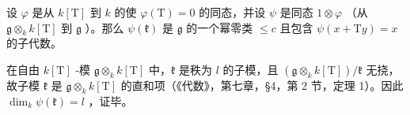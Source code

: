 设 \(\varphi\) 是从 \(k[\mathrm{T}]\) 到 \(k\) 的使 \(\varphi (\mathrm{T}) = 0\) 的同态，并设 \(\psi\) 是同态 \(1\otimes \varphi\) （从 \(\mathfrak{g}\otimes_k k[\mathrm{T}]\) 到 \(\mathfrak{g}\) ）。那么 \(\psi (\mathfrak{k})\) 是 \(\mathfrak{g}\) 的一个幂零类 \(\leq c\) 且包含 \(\psi (x + \mathrm{T}y) = x\) 的子代数。

在自由 \(k[\mathrm{T}]\) -模 \(\mathfrak{g} \otimes_k k[\mathrm{T}]\) 中，\(\mathfrak{k}\) 是秩为 \(l\) 的子模，且 \((\mathfrak{g} \otimes_k k[\mathrm{T}]) / \mathfrak{k}\) 无挠，故子模 \(\mathfrak{k}\) 是 \(\mathfrak{g} \otimes_k k[\mathrm{T}]\) 的直和项（《代数》，第七章，§4，第 2 节，定理 1）。因此 \(\dim_k \psi(\mathfrak{k}) = l\) ，证毕。
\relax{}
